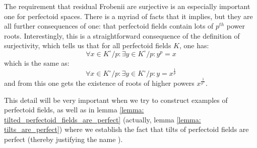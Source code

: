                     \begin{remark} \label{remark: perfectoid_fields_have_p_power_roots}
                        The requirement that residual Frobenii are surjective is an especially important one for perfectoid spaces. There is a myriad of facts that it implies, but they are all further consequences of one: that perfectoid fields contain lots of $p^{th}$ power roots. Interestingly, this is a straightforward consequence of the definition of surjectivity, which tells us that for all perfectoid fields $K$, one has:
                            $$\forall x \in K^{\circ}/p: \exists y \in K^{\circ}/p: y^p = x$$
                        which is the same as:
                            $$\forall x \in K^{\circ}/p: \exists y \in K^{\circ}/p: y = x^{\frac1p}$$
                        and from this one gets the existence of roots of higher powers $x^{\frac{1}{p^n}}$. 
                        
                        This detail will be very important when we try to construct examples of perfectoid fields, as well as in lemma \ref{lemma: tilted_perfectoid_fields_are_perfect} (actually, lemma \ref{lemma: tilts_are_perfect}) where we establish the fact that tilts of perfectoid fields are perfect (thereby justifying the name ).
                    \end{remark}
